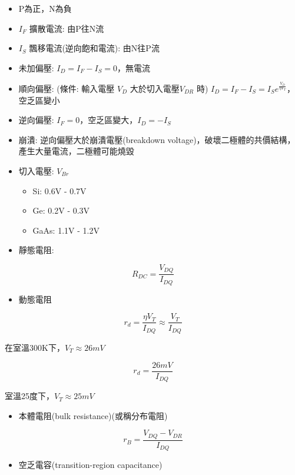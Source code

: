 \documentclass[
]{report}
\providecommand{\tightlist}{%
  \setlength{\itemsep}{0pt}\setlength{\parskip}{0pt}}
\begin{document}
\begin{itemize}
\tightlist
\item
  P為正，N為負
\item
  \(I_F\) 擴散電流: 由P往N流
\item
  \(I_S\) 飄移電流(逆向飽和電流): 由N往P流
\item
  未加偏壓: \(I_D = I_F - I_S = 0\)，無電流
\item
  順向偏壓: (條件: 輸入電壓 \(V_D\) 大於切入電壓\(V_{DR}\) 時)
  \(I_D = I_F - I_S = I_S e^{\frac{V_D}{\eta V_T}}\)，空乏區變小
\item
  逆向偏壓: \(I_F = 0\)，空乏區變大，\(I_D = -I_S\)
\item
  崩潰: 逆向偏壓大於崩潰電壓(breakdown
  voltage)，破壞二極體的共價結構，產生大量電流，二極體可能燒毀
\item
  切入電壓: \(V_{Br}\)

  \begin{itemize}
  \tightlist
  \item
    Si: 0.6V - 0.7V
  \item
    Ge: 0.2V - 0.3V
  \item
    GaAs: 1.1V - 1.2V
  \end{itemize}
\item
  靜態電阻:
\end{itemize}

\[
R_{DC} = \frac{V_{DQ}}{I_{DQ}}
\]

\begin{itemize}
\tightlist
\item
  動態電阻
\end{itemize}

\[
r_d = \frac{\eta V_T}{I_{DQ}} \approx \frac{V_T}{I_{DQ}}
\]

在室溫300K下，\(V_T \approx 26mV\)

\[
r_d = \frac{26mV}{I_{DQ}}
\]

室溫25度下，\(V_T \approx 25mV\)

\begin{itemize}
\tightlist
\item
  本體電阻(bulk resistance)(或稱分布電阻)
\end{itemize}

\[
r_B = \frac{V_{DQ} - V_{DR}}{I_{DQ}}
\]

\begin{itemize}
\tightlist
\item
  空乏電容(transition-region capacitance)
\end{itemize}
\end{document}
